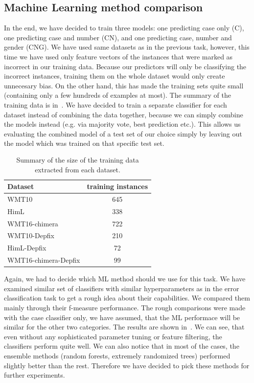 \subsection{Machine Learning method comparison}

In the end, we have decided to train three models: one predicting case only (C), one predicting case and number (CN),
and one predicting case, number and gender (CNG). We have used same datasets as in the previous task, however, this
time we have used only feature vectors of the instances that were marked as incorrect in our training data. Because
our predictors will only be classifying the incorrect instances, training them on the whole dataset would only create
unnecesary bias. On the other hand, this has made the training sets quite small (containing only a few hundreds of examples
at most). The summary of the training data is in~. We have decided to train a separate classifier
for each dataset instead of combining the data together, because we can simply combine the models instead (e.g. via majority
vote, best prediction etc.). This allows us evaluating the combined model of a test set of our choice simply by leaving
out the model which was trained on that specific test set.

\begin{table}[t]
\centering
\small

\begin{tabular}{lc}
Dataset  &  \hash{} training instances  \\
\hline
WMT10  &  645  \\
HimL  & 338  \\
WMT16-chimera  &  722  \\
WMT10-Depfix  &  210  \\
HimL-Depfix  &  72  \\
WMT16-chimera-Depfix  &  99  \\
\end{tabular}
\caption{
    Summary of the size of the training data extracted from each dataset.
}
\label{cats-training-sum}
\end{table}

Again, we had to decide which ML method should we use for this task. 
We have examined similar set of classifiers with similar
hyperparameters as in the error classification task to get a rough idea about their capabilities. We compared them mainly
through their f-measure performance.
The rough comparisons were made with the case classifier only,
we have assumed, that the ML performace will be similar for the other two categories.
The results are shown in~. We can see, that even without any sophisticated parameter
tuning or feature filtering, the classifiers perform quite well. We can also notice that in most of the cases, the ensemble
methods (random forests, extremely randomized trees) performed slightly better than the rest. Therefore we have decided
to pick these methods for further experiments.


